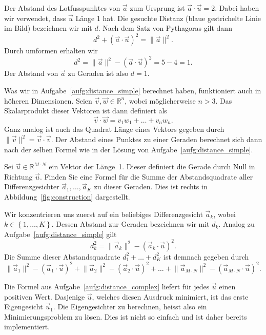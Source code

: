 \begin{losung}
	Der Abstand des Lotfusspunktes von $\vec{a}$ zum Ursprung ist $\vec{a}\cdot\vec{u}=2$.
	Dabei haben wir verwendet, dass $\vec{u}$ Länge 1 hat.
	Die gesuchte Distanz (blaue gestrichelte Linie im Bild) bezeichnen wir mit $d$.
	Nach dem Satz von Pythagoras gilt dann
	\begin{equation*}
		d^2+\left(\vec{a}\cdot\vec{u}\right)^2=\lVert\vec{a}\rVert^2.
	\end{equation*}
	Durch umformen erhalten wir
	\begin{equation*}
		d^2=\lVert\vec{a}\rVert^2-\left(\vec{a}\cdot\vec{u}\right)^2=5-4=1.
	\end{equation*}
	Der Abstand von $\vec{a}$ zu Geraden ist also $d=1$.
\end{losung}
Was wir in Aufgabe~\ref{aufg:distance_simple} berechnet haben, funktioniert auch in höheren Dimensionen.
Seien $\vec v,\vec w\in\mathbb R^n$, wobei möglicherweise $n>3$.
Das Skalarprodukt dieser Vektoren ist dann definiert als
\begin{equation*}
	\vec v\cdot\vec w=v_1w_1+\ldots+v_nw_n.
\end{equation*}
Ganz analog ist auch das Quadrat Länge eines Vektors gegeben durch $\lVert\vec v\rVert^2=\vec v\cdot\vec v$.
Der Abstand eines Punktes zu einer Geraden berechnet sich dann nach der selben Formel wie in der Lösung von Aufgabe~\ref{aufg:distance_simple}.
\begin{aufgabe} \label{aufg:distance_complex}
	Sei $\vec{u}\in\mathbb R^{M\cdot N}$ ein Vektor der Länge~1.
	Dieser definiert die Gerade durch Null in Richtung $\vec{u}$.
	Finden Sie eine Formel für die Summe der Abstandsquadrate aller Differenzgesichter $\vec{a}_1,\ldots,\vec{a}_K$ zu dieser Geraden.
	Dies ist rechts in Abbildung~\ref{fig:construction} dargestellt.
\end{aufgabe}
\begin{losung}
	Wir konzentrieren uns zuerst auf ein beliebiges Differenzgesicht $\vec{a}_k$, wobei $k\in\left\{1,\ldots,K\right\}$.
	Dessen Abstand zur Geraden bezeichnen wir mit $d_k$.
	Analog zu Aufgabe~\ref{aufg:distance_simple} gilt
	\begin{equation*}
		d_k^2=\lVert\vec{a}_k\rVert^2-\left(\vec{a}_k\cdot\vec{u}\right)^2.
	\end{equation*}
	Die Summe dieser Abstandsquadrate $d_1^2+\ldots+d_K^2$ ist demnach gegeben durch
	\begin{equation*}
		\lVert\vec{a}_1\rVert^2-\left(\vec{a}_1\cdot\vec{u}\right)^2
		+\lVert\vec{a}_2\rVert^2-\left(\vec{a}_2\cdot\vec{u}\right)^2
		+\ldots+
		\lVert\vec{a}_{M\cdot N}\rVert^2-\left(\vec{a}_{M\cdot N}\cdot\vec{u}\right)^2.
	\end{equation*}
\end{losung}
Die Formel aus Aufgabe~\ref{aufg:distance_complex} liefert für jedes $\vec{u}$ einen positiven Wert.
Dasjenige $\vec{u}$, welches diesen Ausdruck minimiert, ist das erste Eigengesicht $\vec{u}_1$.
Die Eigengesichter zu berechnen, heisst also ein Minimierungsproblem zu lösen.
Dies ist nicht so einfach und ist daher bereits implementiert.

